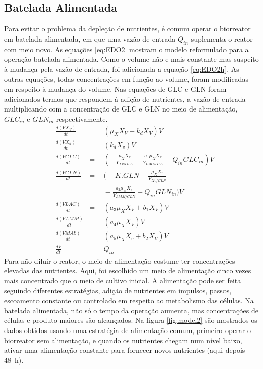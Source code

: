 \documentclass[fleqn,10pt]{SelfArx} %
\begin{document}
\subsection{Batelada Alimentada}
Para evitar o problema da depleção de nutrientes, é comum operar o biorreator em batelada alimentada, em que uma vazão de entrada $Q_{in}$ suplementa o reator com meio novo. As equações \ref{eq:EDO2} mostram o modelo reformulado para a operação batelada alimentada. Como o volume não e mais constante mas suspeito à mudança pela vazão de entrada, foi adicionada a equação \ref{eq:EDO2h}. As outras equações, todas concentrações em função ao volume, foram modificadas em respeito à mudança do volume. Nas equações de GLC e GLN foram adicionados termos que respondem à adição de nutrientes, a vazão de entrada multiplicando com a concentração de GLC e GLN no meio de alimentação, $GLC_{in}$ e $GLN_{in}$ respectivamente.
\begin{subequations} \label{eq:EDO2}
	\begin{align}
	&\frac{d(VX_V)}{dt}\!\!\!\!\!\!\!\!\!\!&=& \;\, \left( \mu _X X_V -k_d X_V\right) V \label{eq:EDO2a}
	\\
	&\frac{d(VX_d)}{dt}\!\!\!\!\!\!\!\!\!\!&=& \;\, \left( k_d X_v\right) V \label{eq:EDO2b}
	\\
	&\frac{d(VGLC)}{dt}\!\!\!\!\!\!\!\!\!\!&=& \;\, \left( -\frac{\mu _X X_v}{Y_{Xv/GLC}}-\frac{a_1 \mu _X X_v}{Y_{LAC/GLC}} + Q_{in}GLC_{in}\right) V \label{eq:EDO2c}
	\\	&\frac{d(VGLN)}{dt}\!\!\!\!\!\!\!\!\!\!&=& \;\, \bigg(-K.GLN -\frac{\mu _X X_v}{Y_{Xv/GLN}} \label{eq:EDO2d} \\ & & & \;\, -\frac{a_2 \mu _X X_v}{Y_{AMM/GLN}}+ Q_{in}GLN_{in}\bigg)V \nonumber
	\\
	&\frac{d(VLAC)}{dt}\!\!\!\!\!\!\!\!\!\!&=& \;\, \left( a_3 \mu _X X_V + b_1 X_V\right) V \label{eq:EDO2e}
	\\
	&\frac{d(VAMM)}{dt}\!\!\!\!\!\!\!\!\!\!&=& \;\, \left( a_4 \mu _X X_V\right) V \label{eq:EDO2f}
	\\
	&\frac{d(VMAb)}{dt}\!\!\!\!\!\!\!\!\!\!&=& \;\, \left( a_5 \mu _X X_v+b_2 X_V\right) V \label{eq:EDO2g}
	\\
	&\frac{dV}{dt}\!\!\!\!\!\!\!\!\!\!&=& \;\, Q_{in} \label{eq:EDO2h}
	\end{align}	
\end{subequations}
Para não diluir o reator, o meio de alimentação costume ter concentrações elevadas das nutrientes. Aqui, foi escolhido um meio de alimentação cinco vezes mais concentrado que o meio de cultivo inicial. A alimentação pode ser feita seguindo diferentes estratégias, adição de nutrientes em impulsos, passos, escoamento constante ou controlado em respeito ao metabolismo das células. Na batelada alimentada, não só o tempo da operação aumenta, mas concentrações de células e produto maiores são alcançados. Na figura \ref{fig:model2} são mostrados os dados obtidos usando uma estratégia de alimentação comum, primeiro operar o biorreator sem alimentação, e quando os nutrientes chegam num nível baixo, ativar uma alimentação constante para fornecer novos nutrientes (aqui depois \SI{48}{h}).
\end{document}

